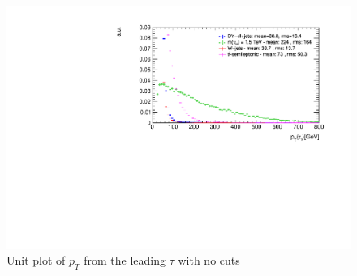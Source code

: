 \documentclass[12pt]{article}
\begin{document}
\begin{figure}[H]
\centering
\includegraphics[scale = 0.7]{Figures/tau1_pT_unitNoCuts}
\caption{Unit plot of $p_{T}$ from the leading $\tau$ with no cuts}
\label{fig: tau1pTunitNC}
\end{figure}
\end{document}
